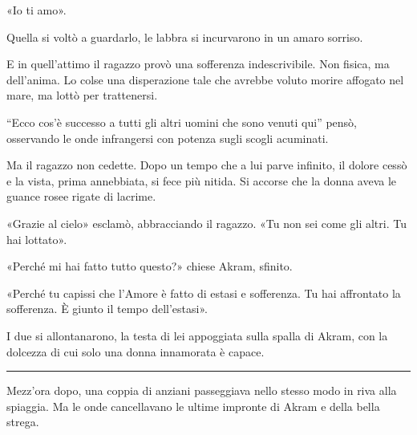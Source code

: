 \documentclass[a4paper,10pt]{memoir}
\begin{document}
«Io ti amo».

Quella si voltò a guardarlo, le labbra si incurvarono in un amaro sorriso.

E in quell'attimo il ragazzo provò una sofferenza indescrivibile. Non fisica, ma dell'anima. Lo colse una disperazione
tale che avrebbe voluto morire affogato nel mare, ma lottò per trattenersi.

``Ecco cos'è successo a tutti gli altri uomini che sono venuti qui'' pensò, osservando le onde infrangersi con potenza
sugli scogli acuminati.

Ma il ragazzo non cedette. Dopo un tempo che a lui parve infinito, il dolore cessò e la vista, prima annebbiata, si fece
più nitida. Si accorse che la donna aveva le guance rosee rigate di lacrime.

«Grazie al cielo» esclamò, abbracciando il ragazzo. «Tu non sei come gli altri. Tu hai lottato».

«Perché mi hai fatto tutto questo?» chiese Akram, sfinito.

«Perché tu capissi che l'Amore è fatto di estasi e sofferenza. Tu hai affrontato la sofferenza. È giunto il tempo
dell'estasi».

I due si allontanarono, la testa di lei appoggiata sulla spalla di Akram, con la dolcezza di cui solo una donna
innamorata è capace.

\plainbreak{1}

Mezz'ora dopo, una coppia di anziani passeggiava nello stesso modo in riva alla spiaggia. Ma le onde cancellavano le
ultime impronte di Akram e della bella strega.
\end{document}
